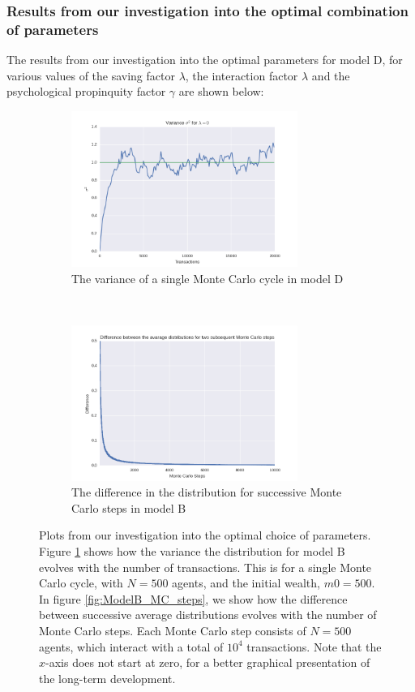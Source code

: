 \documentclass[a4paper, 10pt]{article}
\begin{document}
\subsubsection{Results from our investigation into the optimal combination of parameters}
The results from our investigation into the optimal parameters for model D, for various values of the saving factor $\lambda$, the interaction factor $\lambda$ and the psychological propinquity factor $\gamma$  are shown below:
\begin{figure}[!ht] %
    \centering
    \begin{subfigure}[H!]{0.5\textwidth}
        \centering
        \includegraphics[height=2.0in]{varLamb0.png}
        \caption{The variance of a single Monte Carlo cycle in model D}\label{fig:ModelD_Var}
    \end{subfigure}%
    ~ 
    \begin{subfigure}[H!]{0.5\textwidth}
        \centering
        \includegraphics[height=2.0in]{diffMCLamb0.png}
        \caption{The difference in the distribution for successive Monte Carlo steps in model B}\label{fig:ModelD_MC_steps}
    \end{subfigure}
    \caption{Plots from our investigation into the optimal choice of parameters. Figure \ref{fig:ModelD_Var} shows how the variance the distribution for model B evolves with the number of transactions. This is for a single Monte Carlo cycle, with $N=500$ agents, and the initial wealth, $m0=500$. In figure \ref{fig:ModelB_MC_steps}, we show how the difference between successive average distributions evolves with the number of Monte Carlo steps. Each Monte Carlo step consists of $N=500$ agents, which interact with a total of $10^4$ transactions. Note that the $x$-axis does not start at zero, for a better graphical presentation of the long-term development.}\label{fig:ModelD}
\end{figure} %
\end{document}
